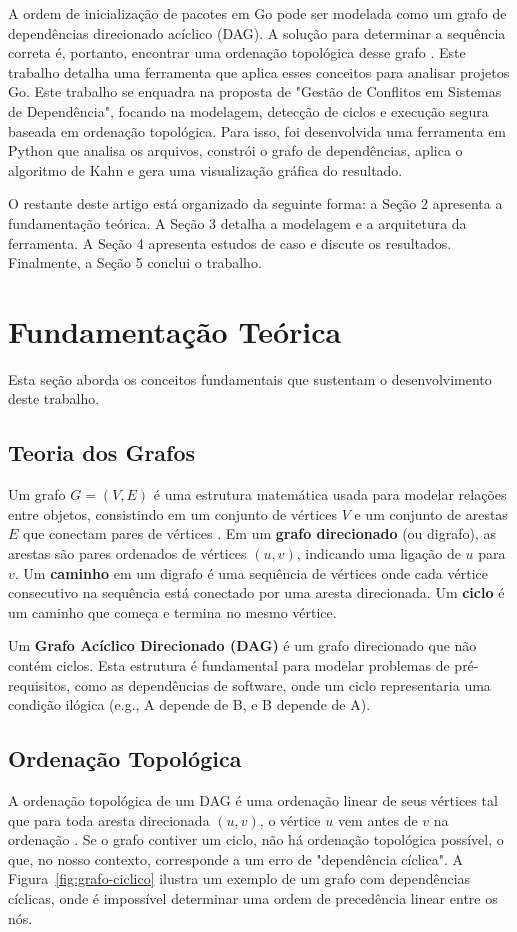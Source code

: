 \documentclass[12pt]{article}
\begin{document}
A ordem de inicialização de pacotes em Go pode ser modelada como um grafo de dependências direcionado acíclico (DAG). A solução para determinar a sequência correta é, portanto, encontrar uma ordenação topológica desse grafo \cite{clrs}. Este trabalho detalha uma ferramenta que aplica esses conceitos para analisar projetos Go. Este trabalho se enquadra na proposta de "Gestão de Conflitos em Sistemas de Dependência", focando na modelagem, detecção de ciclos e execução segura baseada em ordenação topológica. Para isso, foi desenvolvida uma ferramenta em Python que analisa os arquivos, constrói o grafo de dependências, aplica o algoritmo de Kahn e gera uma visualização gráfica do resultado.

O restante deste artigo está organizado da seguinte forma: a Seção 2 apresenta a fundamentação teórica. A Seção 3 detalha a modelagem e a arquitetura da ferramenta. A Seção 4 apresenta estudos de caso e discute os resultados. Finalmente, a Seção 5 conclui o trabalho.

\section{Fundamentação Teórica}
Esta seção aborda os conceitos fundamentais que sustentam o desenvolvimento deste trabalho.

\subsection{Teoria dos Grafos}
Um grafo $G = (V, E)$ é uma estrutura matemática usada para modelar relações entre objetos, consistindo em um conjunto de vértices $V$ e um conjunto de arestas $E$ que conectam pares de vértices \cite{clrs}. Em um \textbf{grafo direcionado} (ou digrafo), as arestas são pares ordenados de vértices $(u, v)$, indicando uma ligação de $u$ para $v$. Um \textbf{caminho} em um digrafo é uma sequência de vértices onde cada vértice consecutivo na sequência está conectado por uma aresta direcionada. Um \textbf{ciclo} é um caminho que começa e termina no mesmo vértice.

Um \textbf{Grafo Acíclico Direcionado (DAG)} é um grafo direcionado que não contém ciclos. Esta estrutura é fundamental
para modelar problemas de pré-requisitos, como as dependências de software, onde um ciclo representaria uma condição ilógica (e.g., A depende de B, e B depende de A).

\subsection{Ordenação Topológica}
A ordenação topológica de um DAG é uma ordenação linear de seus vértices tal que para toda aresta direcionada $(u, v)$, o vértice $u$ vem antes de $v$ na ordenação \cite{clrs}. Se o grafo contiver um ciclo, não há ordenação topológica possível, o que, no nosso contexto, corresponde a um erro de "dependência cíclica". A Figura~\ref{fig:grafo-ciclico} ilustra um exemplo de um grafo com dependências cíclicas, onde é impossível determinar uma ordem de precedência linear entre os nós.
\end{document}
